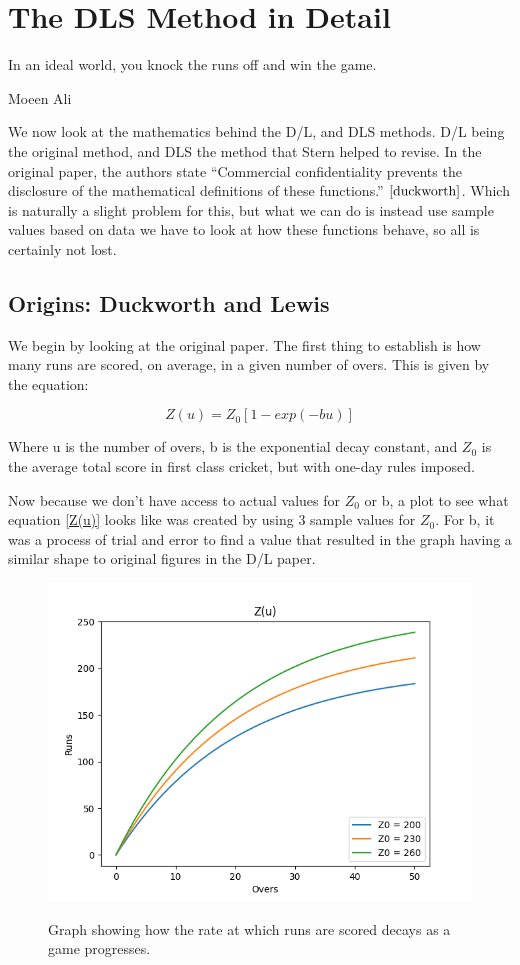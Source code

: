 \chapter{The DLS Method in Detail}

\epigraph{In an ideal world, you knock the runs off and win the game.}{Moeen Ali}

We now look at the mathematics behind the D/L, and DLS methods. D/L being the original
method, and DLS the method that Stern helped to revise. In the original paper, the authors
state ``Commercial confidentiality prevents the disclosure of the mathematical definitions
of these functions.'' $\cite{duckworth}$. Which is naturally a slight problem for this, but what
we can do is instead use sample values based on data we have to look at how these functions behave,
so all is certainly not lost.

\section{Origins: Duckworth and Lewis}
We begin by looking at the original paper. The first thing to establish is how many runs are scored,
on average, in a given number of overs. This is given by the equation:

\begin{equation}
    Z(u) = Z_0[1-exp(-bu)]
    \label{Z(u)}  
\end{equation}

Where u is the number of overs, b is the exponential decay constant, and $Z_0$ is the
average total score in first class cricket, but with one-day rules imposed.  

Now because we don't have access to actual values for $Z_0$ or b, a plot to see what equation \ref{Z(u)} looks 
like was created by using 3 sample values for $Z_0$. For b, it was a process of trial and error to find a value
that resulted in the graph having a similar shape to original figures in the D/L paper. 

\begin{figure}[h]
    \centering
    \includegraphics[scale=0.6]{figures/z(u).png}
    \label{Zugraph}
    \caption{Graph showing how the rate at which runs are scored decays as a game progresses.}
\end{figure}

